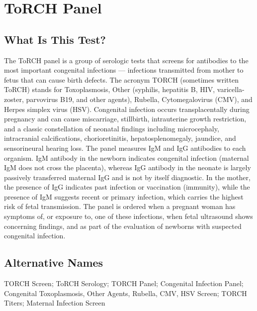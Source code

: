 \chapter{ToRCH Panel}

\section*{What Is This Test?}
The ToRCH panel is a group of serologic tests that screens for antibodies to the most important congenital infections --- infections transmitted from mother to fetus that can cause birth defects. The acronym TORCH (sometimes written ToRCH) stands for Toxoplasmosis, Other (syphilis, hepatitis B, HIV, varicella-zoster, parvovirus B19, and other agents), Rubella, Cytomegalovirus (CMV), and Herpes simplex virus (HSV). Congenital infection occurs transplacentally during pregnancy and can cause miscarriage, stillbirth, intrauterine growth restriction, and a classic constellation of neonatal findings including microcephaly, intracranial calcifications, chorioretinitis, hepatosplenomegaly, jaundice, and sensorineural hearing loss. The panel measures IgM and IgG antibodies to each organism. IgM antibody in the newborn indicates congenital infection (maternal IgM does not cross the placenta), whereas IgG antibody in the neonate is largely passively transferred maternal IgG and is not by itself diagnostic. In the mother, the presence of IgG indicates past infection or vaccination (immunity), while the presence of IgM suggests recent or primary infection, which carries the highest risk of fetal transmission. The panel is ordered when a pregnant woman has symptoms of, or exposure to, one of these infections, when fetal ultrasound shows concerning findings, and as part of the evaluation of newborns with suspected congenital infection.

\section*{Alternative Names}
TORCH Screen; ToRCH Serology; TORCH Panel; Congenital Infection Panel; Congenital Toxoplasmosis, Other Agents, Rubella, CMV, HSV Screen; TORCH Titers; Maternal Infection Screen

